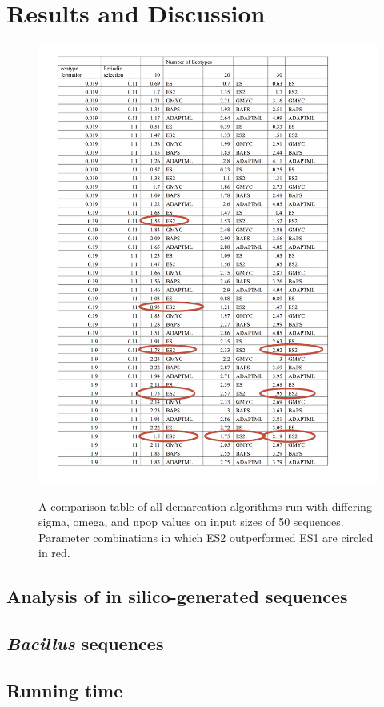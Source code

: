 \section{Results and Discussion}

\begin{figure}[h!]
  \caption[Demarcation comparison table for small inputs (nu = 50).]{A comparison table of all demarcation algorithms run with differing sigma, omega, and npop values on input sizes of 50 sequences. Parameter combinations in which ES2 outperformed ES1 are circled in red.}
  \centering
    \includegraphics{images/ComparisonTable1.png}
    \label{fig:ComparisonSmall}
\end{figure}

\subsection{Analysis of in silico-generated sequences}
\subsection{\emph{Bacillus} sequences}
\subsection{Running time}